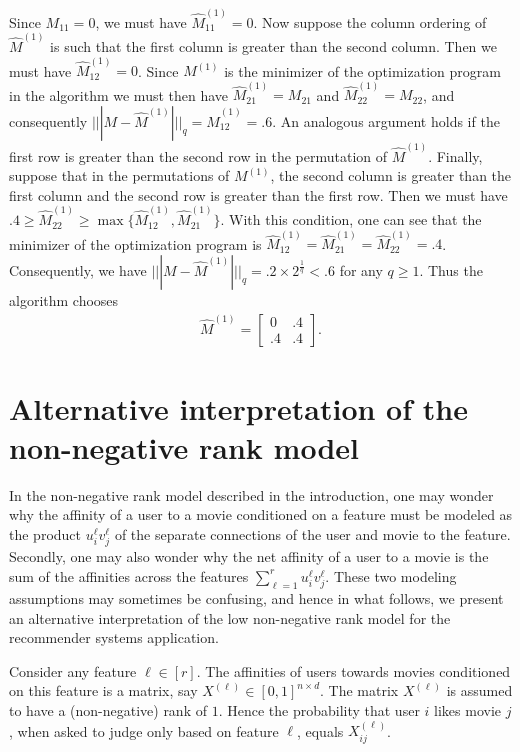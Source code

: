 \documentclass[11pt, hidelinks]{article} %
\newcommand{\matsnorm}[2]{|\!|\!| #1 | \! | \!|_{{#2}}}
\newcommand{\numrows}{n}
\newcommand{\numcols}{d}
\newcommand{\wtmatrix}{M}
\newcommand{\wt}{\wtmatrix}
\newcommand{\wthat}{\widehat{\wtmatrix}}
\newcommand{\nnrank}{r}
\newcommand{\lowLeftVec}[1]{u^{#1}}
\newcommand{\lowRightVec}[1]{v^{#1}}
\newcommand{\entrynorm}{q}
\begin{document}
Since $\wt_{11} = 0$, we must have $\wthat^{(1)}_{11} = 0$. Now
suppose the column ordering of $\wthat^{(1)}$ is such that the first
column is greater than the second column. Then we must have
$\wthat^{(1)}_{12} = 0$. Since $\wt^{(1)}$ is the minimizer of the
optimization program in the algorithm we must then have
$\wthat^{(1)}_{21} = \wt_{21}$ and $\wthat^{(1)}_{22} = \wt_{22}$, and
consequently $\matsnorm{\wt - \wthat^{(1)}}{\entrynorm} =
\wthat^{(1)}_{12} = .6$. An analogous argument holds if the first row
is greater than the second row in the permutation of
$\wthat^{(1)}$. Finally, suppose that in the permutations of
$\wt^{(1)}$, the second column is greater than the first column and
the second row is greater than the first row. Then we must have $.4
\geq \wthat^{(1)}_{22} \geq \max\{\wthat^{(1)}_{12}, \wthat^{(1)}_{21}
\}$. With this condition, one can see that the minimizer of the
optimization program is $\wthat^{(1)}_{12} = \wthat^{(1)}_{21} =
\wthat^{(1)}_{22} = .4$. Consequently, we have $\matsnorm{\wt -
  \wthat^{(1)}}{\entrynorm} = .2 \times 2^{\frac{1}{\entrynorm}} <
.6$  for any $q \geq 1$. Thus the
algorithm chooses
\begin{align*}
\wthat^{(1)} = 
\begin{bmatrix}
0 & .4 \\ .4 & .4
\end{bmatrix}.
\end{align*}



\section{Alternative interpretation of the non-negative rank model}
\label{SecAlternativeInterpretationOfNNRank}

In the non-negative rank model described in the introduction, one may
wonder why the affinity of a user to a movie conditioned on a feature
must be modeled as the product $\lowLeftVec{\ell}_i
\lowRightVec{\ell}_j$ of the separate connections of the user and
movie to the feature. Secondly, one may also wonder why the net
affinity of a user to a movie is the sum of the affinities across the
features $\sum_{\ell = 1}^{\nnrank} \lowLeftVec{\ell}_i
\lowRightVec{\ell}_j$. These two modeling assumptions may sometimes be
confusing, and hence in what follows, we present an alternative
interpretation of the low non-negative rank model for the recommender
systems application.

Consider any feature $\ell \in [\nnrank]$. The affinities of users
towards movies conditioned on this feature is a matrix, say
$X^{(\ell)} \in [0,1]^{\numrows \times \numcols}$. The matrix
$X^{(\ell)}$ is assumed to have a (non-negative) rank of $1$. Hence
the probability that user $i$ likes movie $j$, when asked to judge
only based on feature $\ell$, equals $X^{(\ell)}_{ij}$.
\end{document}
